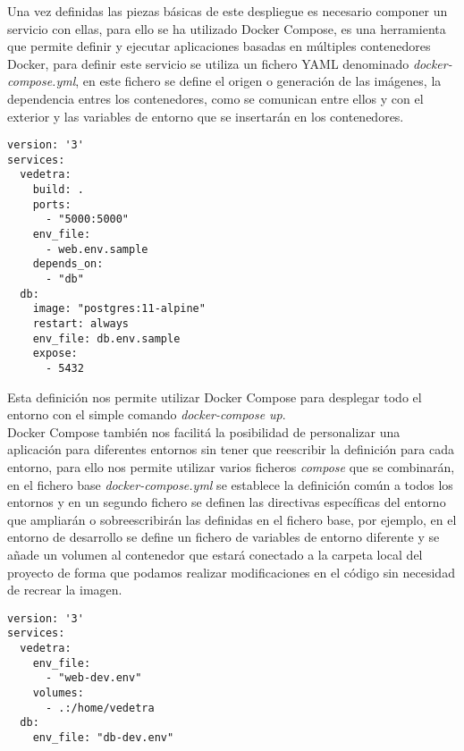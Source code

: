 \documentclass[../proyecto.tex]{subfiles}
\begin{document}
{{{Una vez definidas las piezas básicas de este despliegue es necesario componer un servicio con ellas, para ello se ha utilizado Docker Compose, es una herramienta que permite definir y ejecutar aplicaciones basadas en múltiples contenedores Docker, para definir este servicio se utiliza un fichero YAML denominado \textit{docker-compose.yml}, en este fichero se define el origen o generación de las imágenes, la dependencia entres los contenedores, como se comunican entre ellos y con el exterior y las variables de entorno que se insertarán en los contenedores. \\

\begin{minipage}{\linewidth}
\begin{lstlisting}[caption=Fichero docker-compose.yml base, captionpos=b, frame=single]
version: '3'
services:
  vedetra:
    build: .
    ports:
      - "5000:5000"
    env_file:
      - web.env.sample
    depends_on:
      - "db"
  db:
    image: "postgres:11-alpine"
    restart: always
    env_file: db.env.sample
    expose:
      - 5432
\end{lstlisting}
\end{minipage}

Esta definición nos permite utilizar Docker Compose para desplegar todo el entorno con el simple comando \textit{docker-compose up}.\\

Docker Compose también nos facilitá la posibilidad de personalizar una aplicación para  diferentes entornos sin tener que reescribir la definición para cada entorno, para ello nos permite utilizar varios ficheros \textit{compose} que se combinarán, en el fichero base \textit{docker-compose.yml} se establece la definición común a todos los entornos y en un segundo fichero se definen las directivas específicas del entorno que ampliarán o sobreescribirán las definidas en el fichero base, por ejemplo, en el entorno de desarrollo se define un fichero de variables de entorno diferente y se añade un volumen al contenedor que estará conectado a la carpeta local del proyecto de forma que podamos realizar modificaciones en el código sin necesidad de recrear la imagen.\\

\begin{minipage}{\linewidth}
\begin{lstlisting}[caption=Fichero docker-compose.yml para el entorno de desarrollo, captionpos=b, frame=single]
version: '3'
services:
  vedetra:
    env_file:
      - "web-dev.env"
    volumes:
      - .:/home/vedetra
  db:
    env_file: "db-dev.env"
\end{lstlisting}
\end{minipage}

}}}
\end{document}
